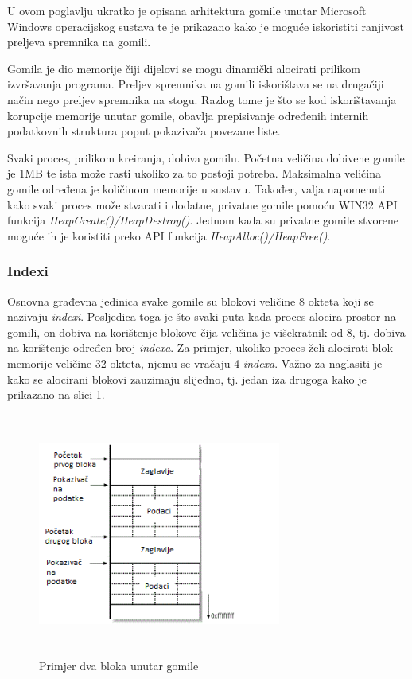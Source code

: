\documentclass[times, utf8, diplomski, numeric]{fer}
\begin{document}
U ovom poglavlju ukratko je opisana arhitektura gomile unutar
Microsoft Windows operacijskog sustava te je prikazano kako je
moguće iskoristiti ranjivost preljeva spremnika na gomili.

Gomila je dio memorije čiji dijelovi se mogu dinamički alocirati
prilikom izvršavanja programa. Preljev spremnika na gomili
iskorištava se na drugačiji način nego preljev spremnika na
stogu. Razlog tome je što se kod iskorištavanja korupcije
memorije unutar gomile, obavlja prepisivanje određenih internih
podatkovnih struktura poput pokazivača povezane liste.

Svaki proces, prilikom kreiranja, dobiva gomilu. Početna veličina
dobivene gomile je 1MB te ista može rasti ukoliko za to postoji
potreba. Maksimalna veličina gomile određena je količinom
memorije u sustavu. Također, valja napomenuti kako svaki proces
može stvarati i dodatne, privatne gomile pomoću WIN32 API
funkcija \emph{HeapCreate()/HeapDestroy()}. Jednom kada su
privatne gomile stvorene moguće ih je koristiti preko API
funkcija \emph{HeapAlloc()/HeapFree()}.

\subsubsection{Indexi}
Osnovna građevna jedinica svake gomile su blokovi veličine 8
okteta koji se nazivaju \emph{indexi}. Posljedica toga je što
svaki puta kada proces alocira prostor na gomili, on dobiva na
korištenje blokove čija veličina je višekratnik od 8, tj. dobiva
na korištenje određen broj \emph{indexa}. Za primjer, ukoliko
proces želi alocirati blok memorije veličine 32 okteta, njemu se
vračaju 4 \emph{indexa}. Važno za naglasiti je kako se alocirani
blokovi zauzimaju slijedno, tj. jedan iza drugoga kako je
prikazano na slici \ref{fig:heap_2_allocated_blocks}.

\begin{figure}[!ht]
\centering
\setlength\fboxsep{0pt}
\setlength\fboxrule{0.5pt}
\includegraphics[width=8cm, height=8cm]{slike/heap_2_allocated_blocks}
\caption{Primjer dva bloka unutar gomile}
\label{fig:heap_2_allocated_blocks} 
\end{figure}
\end{document}

